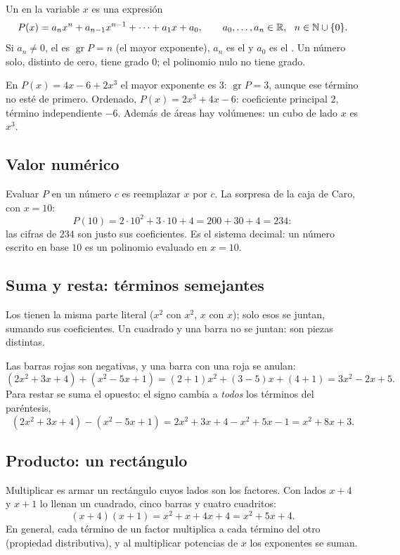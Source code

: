\documentclass[11pt,a4paper]{article}
\def\X{1.7}\def\U{0.34}
\newcommand{\rectbloques}[2]{%
  \draw[cuadrado] (0,0) rectangle (\X,\X);
  \node[font=\small] at (\X/2,\X/2) {$x^2$};
  \foreach \i in {1,...,#1} \draw[barra] ({\X+(\i-1)*\U},0) rectangle ({\X+\i*\U},\X);
  \foreach \j in {1,...,#2} \draw[barra] (0,{\X+(\j-1)*\U}) rectangle (\X,{\X+\j*\U});
  \foreach \i in {1,...,#1} \foreach \j in {1,...,#2}
    \draw[cuadrito] ({\X+(\i-1)*\U},{\X+(\j-1)*\U}) rectangle ({\X+\i*\U},{\X+\j*\U});
  \draw[decorate,decoration={brace,mirror,amplitude=4pt},zmute] (0,-0.1) -- (\X,-0.1) node[midway,below=4pt,font=\small,text=zink]{$x$};
  \draw[decorate,decoration={brace,mirror,amplitude=4pt},zmute] (\X,-0.1) -- ({\X+#1*\U},-0.1) node[midway,below=4pt,font=\small,text=zink]{$#1$};
  \draw[decorate,decoration={brace,amplitude=4pt},zmute] (-0.1,0) -- (-0.1,\X) node[midway,left=4pt,font=\small,text=zink]{$x$};
  \draw[decorate,decoration={brace,amplitude=4pt},zmute] (-0.1,\X) -- (-0.1,{\X+#2*\U}) node[midway,left=4pt,font=\small,text=zink]{$#2$};}
\begin{document}
\begin{definicion}[Polinomio]
Un  en la variable $x$ es una expresión
\[ P(x)=a_nx^{n}+a_{n-1}x^{n-1}+\cdots+a_1x+a_0,\qquad a_0,\dots,a_n\in\mathbb{R},\ \ n\in\mathbb{N}\cup\{0\}. \]
Si $a_n\neq0$, el  es $\operatorname{gr}P=n$ (el mayor exponente), $a_n$ es el 
y $a_0$ es el . Un número solo, distinto de cero, tiene grado $0$; el polinomio nulo no
tiene grado.
\end{definicion}
\begin{ejemplo}
En $P(x)=4x-6+2x^{3}$ el mayor exponente es $3$: $\operatorname{gr}P=3$, aunque ese término no esté de primero.
Ordenado, $P(x)=2x^{3}+4x-6$: coeficiente principal $2$, término independiente $-6$. Además de áreas hay volúmenes:
un cubo de lado $x$ es $x^3$.
\end{ejemplo}

\subsection{Valor numérico}
Evaluar $P$ en un número $c$ es reemplazar $x$ por $c$. La sorpresa de la caja de Caro, con $x=10$:
\[ P(10)=2\cdot10^{2}+3\cdot10+4=200+30+4=234 : \]
las cifras de $234$ son justo sus coeficientes. Es el sistema decimal: un número escrito en base $10$ es un polinomio
evaluado en $x=10$.

\subsection{Suma y resta: términos semejantes}
Los  tienen la misma parte literal ($x^2$ con $x^2$, $x$ con $x$); solo esos se juntan,
sumando sus coeficientes. Un cuadrado y una barra no se juntan: son piezas distintas.
\begin{ejemplo}
Las barras rojas son negativas, y una barra con una roja se anulan:
\[ (2x^2+3x+4)+(x^2-5x+1)=(2+1)x^2+(3-5)x+(4+1)=3x^2-2x+5 . \]
Para restar se suma el opuesto: el signo cambia a \emph{todos} los términos del paréntesis,
\[ (2x^2+3x+4)-(x^2-5x+1)=2x^2+3x+4-x^2+5x-1=x^2+8x+3 . \]
\end{ejemplo}

\subsection{Producto: un rectángulo}
\begin{minipage}[c]{0.6\linewidth}
Multiplicar es armar un rectángulo cuyos lados son los factores. Con lados $x+4$ y $x+1$ lo llenan un cuadrado,
cinco barras y cuatro cuadritos:
\[ (x+4)(x+1)=x^2+x+4x+4=x^2+5x+4 . \]
En general, cada término de un factor multiplica a cada término del otro (propiedad distributiva), y al multiplicar
potencias de $x$ los exponentes se suman.
\end{minipage}\hfill
\begin{minipage}[c]{0.36\linewidth}\centering
{}
\end{minipage}
\end{document}
